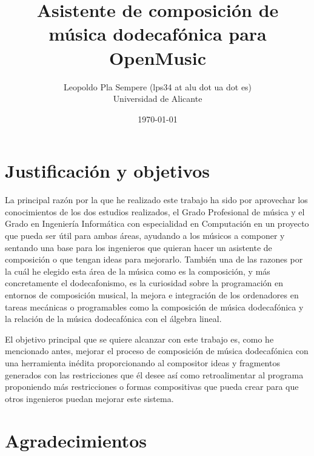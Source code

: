 \documentclass[a4paper,openany,oneside,12pt]{book}
\begin{document}

\thispagestyle{empty} %

\title{Asistente de composici\'on de m\'usica dodecaf\'onica para OpenMusic}
\author{
        Leopoldo Pla Sempere (lps34 at alu dot ua dot es)\\
        Universidad de Alicante\\
}

\date{\today}
\maketitle

\newpage
\mbox{}
\thispagestyle{empty} %


\chapter*{Justificación y objetivos}
La principal razón por la que he realizado este trabajo ha sido por aprovechar los conocimientos de los dos estudios realizados, el Grado Profesional de música y el Grado en Ingeniería Informática con especialidad en Computación en un proyecto que pueda ser útil para ambas áreas, ayudando a los músicos a componer y sentando una base para los ingenieros que quieran hacer un asistente de composición o que tengan ideas para mejorarlo. También una de las razones por la cuál he elegido esta área de la música como es la composición, y más concretamente el dodecafonismo, es la curiosidad sobre la programación en entornos de composición musical, la mejora e integración de los ordenadores en tareas mecánicas o programables como la composición de música dodecafónica y la relación de la música dodecafónica con el álgebra lineal.

El objetivo principal que se quiere alcanzar con este trabajo es, como he mencionado antes, mejorar el proceso de composición de música dodecafónica con una herramienta inédita proporcionando al compositor ideas y fragmentos generados con las restricciones que él desee así como retroalimentar al programa proponiendo más restricciones o formas compositivas que pueda crear para que otros ingenieros puedan mejorar este sistema.


\chapter*{Agradecimientos}
 
\end{document}
